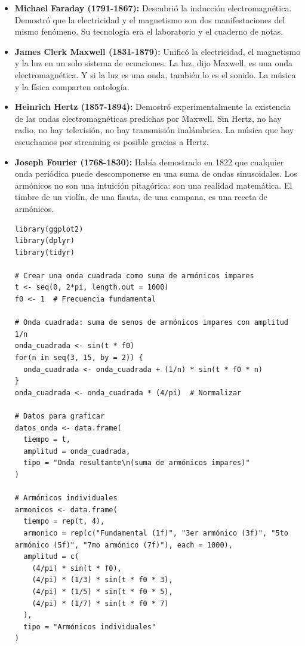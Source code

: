 \documentclass[14pt, a4paper]{article}
\begin{document}
\begin{enumerate}
\begin{itemize}
\item \textbf{\textbf{Michael Faraday (1791-1867):}} Descubrió la inducción
electromagnética. Demostró que la electricidad y el magnetismo son
dos manifestaciones del mismo fenómeno. Su tecnología era el
laboratorio y el cuaderno de notas.

\item \textbf{\textbf{James Clerk Maxwell (1831-1879):}} Unificó la electricidad, el
magnetismo y la luz en un solo sistema de ecuaciones. La luz, dijo
Maxwell, es una onda electromagnética. Y si la luz es una onda,
también lo es el sonido. La música y la física comparten ontología.

\item \textbf{\textbf{Heinrich Hertz (1857-1894):}} Demostró experimentalmente la
existencia de las ondas electromagnéticas predichas por Maxwell. Sin
Hertz, no hay radio, no hay televisión, no hay transmisión
inalámbrica. La música que hoy escuchamos por streaming es posible
gracias a Hertz.

\item \textbf{\textbf{Joseph Fourier (1768-1830):}} Había demostrado en 1822 que
cualquier onda periódica puede descomponerse en una suma de ondas
sinusoidales. Los armónicos no son una intuición pitagórica: son una
realidad matemática. El timbre de un violín, de una flauta, de una
campana, es una receta de armónicos.

\begin{verbatim}
library(ggplot2)
library(dplyr)
library(tidyr)

# Crear una onda cuadrada como suma de armónicos impares
t <- seq(0, 2*pi, length.out = 1000)
f0 <- 1  # Frecuencia fundamental

# Onda cuadrada: suma de senos de armónicos impares con amplitud 1/n
onda_cuadrada <- sin(t * f0)
for(n in seq(3, 15, by = 2)) {
  onda_cuadrada <- onda_cuadrada + (1/n) * sin(t * f0 * n)
}
onda_cuadrada <- onda_cuadrada * (4/pi)  # Normalizar

# Datos para graficar
datos_onda <- data.frame(
  tiempo = t,
  amplitud = onda_cuadrada,
  tipo = "Onda resultante\n(suma de armónicos impares)"
)

# Armónicos individuales
armonicos <- data.frame(
  tiempo = rep(t, 4),
  armonico = rep(c("Fundamental (1f)", "3er armónico (3f)", "5to armónico (5f)", "7mo armónico (7f)"), each = 1000),
  amplitud = c(
    (4/pi) * sin(t * f0),
    (4/pi) * (1/3) * sin(t * f0 * 3),
    (4/pi) * (1/5) * sin(t * f0 * 5),
    (4/pi) * (1/7) * sin(t * f0 * 7)
  ),
  tipo = "Armónicos individuales"
)


\end{verbatim}
\end{itemize}
\end{enumerate}
\end{document}
